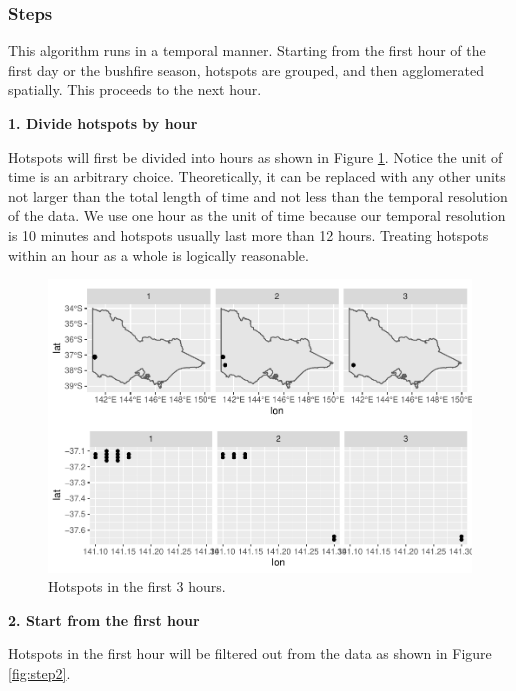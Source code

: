 \hypertarget{steps}{%
\subsubsection{Steps}\label{steps}}

This algorithm runs in a temporal manner. Starting from the first hour
of the first day or the bushfire season, hotspots are grouped, and then
agglomerated spatially. This proceeds to the next hour.

\textbf{1. Divide hotspots by hour}

Hotspots will first be divided into hours as shown in Figure
\ref{fig:step1}. Notice the unit of time is an arbitrary choice.
Theoretically, it can be replaced with any other units not larger than
the total length of time and not less than the temporal resolution of
the data. We use one hour as the unit of time because our temporal
resolution is 10 minutes and hotspots usually last more than 12 hours.
Treating hotspots within an hour as a whole is logically reasonable.

\begin{Schunk}
\begin{figure}
\includegraphics[width=0.8\linewidth]{clustering_paper_files/figure-latex/step1-1} \caption[Hotspots in the first 3 hours]{Hotspots in the first 3 hours.}\label{fig:step1}
\end{figure}
\end{Schunk}

\textbf{2. Start from the first hour}

Hotspots in the first hour will be filtered out from the data as shown
in Figure \ref{fig:step2}.

